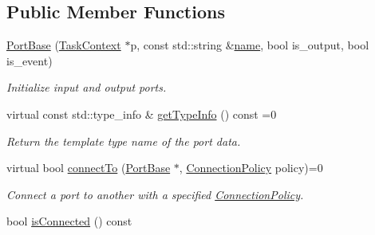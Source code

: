 \subsection*{Public Member Functions}
\begin{DoxyCompactItemize}
\item 
\hypertarget{classcoco_1_1_port_base_a57e506ec75f7e6760fcf2cdfa8450d99}{}\hyperlink{classcoco_1_1_port_base_a57e506ec75f7e6760fcf2cdfa8450d99}{Port\+Base} (\hyperlink{classcoco_1_1_task_context}{Task\+Context} $\ast$p, const std\+::string \&\hyperlink{classcoco_1_1_port_base_abf4eb7fcc3ec9973ee73dd140e7646db}{name}, bool is\+\_\+output, bool is\+\_\+event)\label{classcoco_1_1_port_base_a57e506ec75f7e6760fcf2cdfa8450d99}

\begin{DoxyCompactList}\small\item\em Initialize input and output ports. \end{DoxyCompactList}\item 
\hypertarget{classcoco_1_1_port_base_af8a455d7672cb6f13aa37cee2a9acc94}{}virtual const std\+::type\+\_\+info \& \hyperlink{classcoco_1_1_port_base_af8a455d7672cb6f13aa37cee2a9acc94}{get\+Type\+Info} () const =0\label{classcoco_1_1_port_base_af8a455d7672cb6f13aa37cee2a9acc94}

\begin{DoxyCompactList}\small\item\em Return the template type name of the port data. \end{DoxyCompactList}\item 
\hypertarget{classcoco_1_1_port_base_abc0fcdf9a73f1f8e66905feb2dc2b374}{}virtual bool \hyperlink{classcoco_1_1_port_base_abc0fcdf9a73f1f8e66905feb2dc2b374}{connect\+To} (\hyperlink{classcoco_1_1_port_base}{Port\+Base} $\ast$, \hyperlink{structcoco_1_1_connection_policy}{Connection\+Policy} policy)=0\label{classcoco_1_1_port_base_abc0fcdf9a73f1f8e66905feb2dc2b374}

\begin{DoxyCompactList}\small\item\em Connect a port to another with a specified \hyperlink{structcoco_1_1_connection_policy}{Connection\+Policy}. \end{DoxyCompactList}\item 
\hypertarget{classcoco_1_1_port_base_aca58d449d57e44cb7d47cdeb543e8b8f}{}bool \hyperlink{classcoco_1_1_port_base_aca58d449d57e44cb7d47cdeb543e8b8f}{is\+Connected} () const \label{classcoco_1_1_port_base_aca58d449d57e44cb7d47cdeb543e8b8f}


\end{DoxyCompactItemize}
